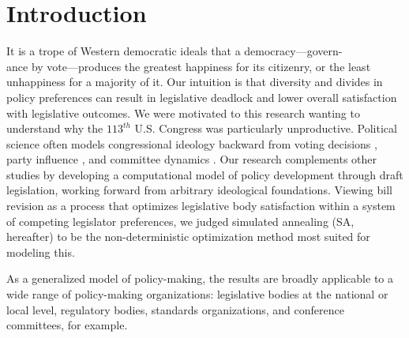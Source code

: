 \documentclass[pdftex,12pt,oribibl]{llncs}
\begin{document}
\section{Introduction}
%
%
%
%

It is a trope of Western democratic ideals that a democracy---govern-\\ance by vote---produces the greatest happiness for its citizenry, or the least unhappiness for a majority of it.
Our intuition is that diversity and divides in policy preferences can result in legislative deadlock and lower overall satisfaction with legislative outcomes.
We were motivated to this research wanting to understand why the $113^{th}$ U.S. Congress was particularly unproductive.
Political science often models congressional ideology backward from voting decisions \parencite{m74, k89}, party influence \parencite{cm93,cm05,a95,k91, k98}, and committee dynamics \parencite{sw87, gk89, m04}.
Our research complements other studies by developing a computational model of policy development through draft legislation, working forward from arbitrary ideological foundations.
Viewing bill revision as a process that optimizes legislative body satisfaction within a system of competing legislator preferences, we judged simulated annealing (SA, hereafter) to be the non-deterministic optimization method most suited for modeling this.

As a generalized model of policy-making, the results are broadly applicable to a wide range of policy-making organizations: legislative bodies at the national or local level, regulatory bodies, standards organizations, and conference committees, for example.
\end{document}

